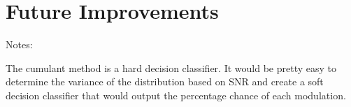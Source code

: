 \chapter{Future Improvements}

Notes:

The cumulant method is a hard decision classifier.  It would be pretty easy to
determine the variance of the distribution based on SNR and create a soft
decision classifier that would output the percentage chance of each modulation.
